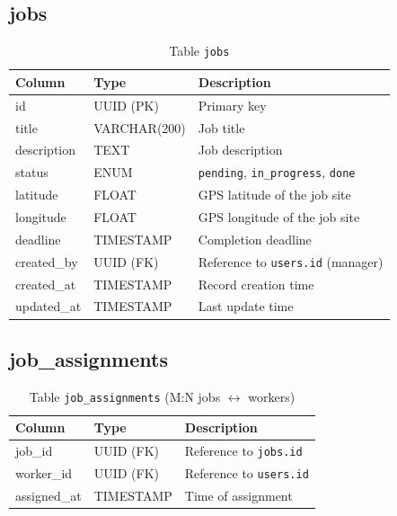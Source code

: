 \subsection{jobs}
\begin{table}[H]
  \centering
  \begin{tabularx}{\textwidth}{llX}
    \toprule
    \textbf{Column} & \textbf{Type} & \textbf{Description} \\
    \midrule
    id            & UUID (PK)     & Primary key \\
    title         & VARCHAR(200)  & Job title \\
    description   & TEXT          & Job description \\
    status        & ENUM          & \texttt{pending}, \texttt{in\_progress}, \texttt{done} \\
    latitude      & FLOAT         & GPS latitude of the job site \\
    longitude     & FLOAT         & GPS longitude of the job site \\
    deadline      & TIMESTAMP     & Completion deadline \\
    created\_by   & UUID (FK)     & Reference to \texttt{users.id} (manager) \\
    created\_at   & TIMESTAMP     & Record creation time \\
    updated\_at   & TIMESTAMP     & Last update time \\
    \bottomrule
  \end{tabularx}
  \caption{Table \texttt{jobs}}
\end{table}

\subsection{job\_assignments}
\begin{table}[H]
  \centering
  \begin{tabularx}{\textwidth}{llX}
    \toprule
    \textbf{Column} & \textbf{Type} & \textbf{Description} \\
    \midrule
    job\_id      & UUID (FK)  & Reference to \texttt{jobs.id} \\
    worker\_id   & UUID (FK)  & Reference to \texttt{users.id} \\
    assigned\_at & TIMESTAMP  & Time of assignment \\
    \bottomrule
  \end{tabularx}
  \caption{Table \texttt{job\_assignments} (M:N jobs $\leftrightarrow$ workers)}
\end{table}

